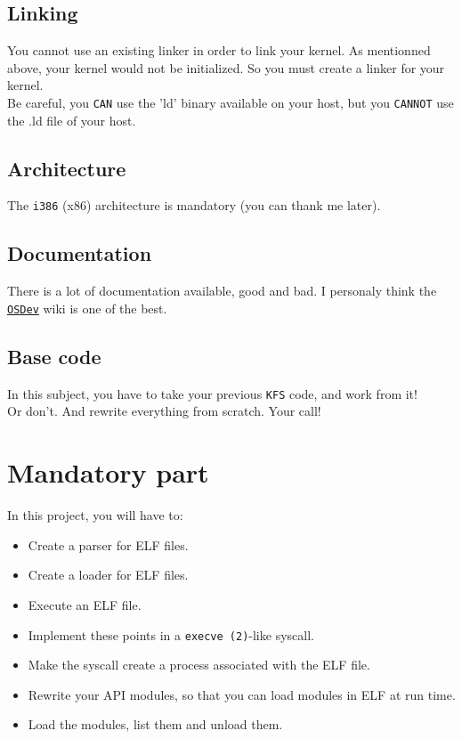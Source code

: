 \documentclass{42-en}
\begin{document}
    \section{Linking}
        You cannot use an existing linker in order to link your kernel.
        As mentionned above, your kernel would not be initialized. So you must
        create a linker for your kernel.\\
        Be careful, you \texttt{CAN} use the 'ld' binary available on your
        host, but you \texttt{CANNOT} use the .ld file of your host.
    \section{Architecture}
        The \texttt{i386} (x86) architecture is mandatory (you can thank
        me later).
    \section{Documentation}
        There is a lot of documentation available, good and bad.
        I personaly think the \texttt{\href{http://wiki.osdev.org/Main_Page}
        {OSDev}} wiki is one of the best.
    \section{Base code}
        In this subject, you have to take your previous \texttt{KFS} code,
        and work from it!\\
        Or don't. And rewrite everything from scratch. Your call!
\newpage

\chapter{Mandatory part}
    In this project, you will have to:
    \begin{itemize}\itemsep1pt
        \item Create a parser for ELF files.
        \item Create a loader for ELF files.
        \item Execute an ELF file.
        \item Implement these points in a \texttt{execve (2)}-like
        syscall.
        \item Make the syscall create a process associated with the ELF file.
        \item Rewrite your API modules, so that you can load
        modules in ELF at run time.
        \item Load the modules, list them and unload them.
    \end{itemize}
\end{document}
